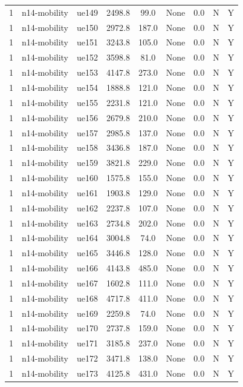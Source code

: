 \begin{table}[ht]
\begin{tabular}{|c|c|c|c|c|c|c|c|c|}
1 & n14-mobility & ue149 & 2498.8 & 99.0 & None & 0.0 & N & Y \\
1 & n14-mobility & ue150 & 2972.8 & 187.0 & None & 0.0 & N & Y \\
1 & n14-mobility & ue151 & 3243.8 & 105.0 & None & 0.0 & N & Y \\
1 & n14-mobility & ue152 & 3598.8 & 81.0 & None & 0.0 & N & Y \\
1 & n14-mobility & ue153 & 4147.8 & 273.0 & None & 0.0 & N & Y \\
1 & n14-mobility & ue154 & 1888.8 & 121.0 & None & 0.0 & N & Y \\
1 & n14-mobility & ue155 & 2231.8 & 121.0 & None & 0.0 & N & Y \\
1 & n14-mobility & ue156 & 2679.8 & 210.0 & None & 0.0 & N & Y \\
1 & n14-mobility & ue157 & 2985.8 & 137.0 & None & 0.0 & N & Y \\
1 & n14-mobility & ue158 & 3436.8 & 187.0 & None & 0.0 & N & Y \\
1 & n14-mobility & ue159 & 3821.8 & 229.0 & None & 0.0 & N & Y \\
1 & n14-mobility & ue160 & 1575.8 & 155.0 & None & 0.0 & N & Y \\
1 & n14-mobility & ue161 & 1903.8 & 129.0 & None & 0.0 & N & Y \\
1 & n14-mobility & ue162 & 2237.8 & 107.0 & None & 0.0 & N & Y \\
1 & n14-mobility & ue163 & 2734.8 & 202.0 & None & 0.0 & N & Y \\
1 & n14-mobility & ue164 & 3004.8 & 74.0 & None & 0.0 & N & Y \\
1 & n14-mobility & ue165 & 3446.8 & 128.0 & None & 0.0 & N & Y \\
1 & n14-mobility & ue166 & 4143.8 & 485.0 & None & 0.0 & N & Y \\
1 & n14-mobility & ue167 & 1602.8 & 111.0 & None & 0.0 & N & Y \\
1 & n14-mobility & ue168 & 4717.8 & 411.0 & None & 0.0 & N & Y \\
1 & n14-mobility & ue169 & 2259.8 & 74.0 & None & 0.0 & N & Y \\
1 & n14-mobility & ue170 & 2737.8 & 159.0 & None & 0.0 & N & Y \\
1 & n14-mobility & ue171 & 3185.8 & 237.0 & None & 0.0 & N & Y \\
1 & n14-mobility & ue172 & 3471.8 & 138.0 & None & 0.0 & N & Y \\
1 & n14-mobility & ue173 & 4125.8 & 431.0 & None & 0.0 & N & Y \\

\end{tabular}
\end{table}
